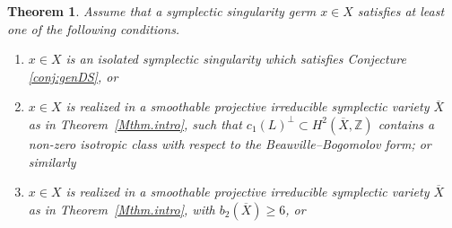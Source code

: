\documentclass[12pt,a4paper]{amsart}
\newtheorem{Thm}{Theorem}[section]
\theoremstyle{remark}
\theoremstyle{definition}
\begin{document}
\begin{Thm}\label{r1prop}
Assume that a symplectic singularity germ 
$x\in X$ satisfies at least one of the following conditions. 
\begin{enumerate}
\item \label{r1prop:isolcase}
    $x\in X$ is an isolated symplectic singularity which 
satisfies Conjecture \ref{conj:genDS}, 
or 
\item \label{r1prop:withisotrop}
$x\in X$ is realized in a smoothable projective irreducible 
symplectic variety 
$\overline{X}$ as in Theorem~\ref{Mthm.intro}, such that
$c_1(L)^{\perp}\subset H^2(\overline{X},\mathbb{Z})$
contains a non-zero isotropic class with respect to the
Beauville--Bogomolov form; or similarly 

\item \label{r1prop:bigb2case}
$x\in X$ is realized in a smoothable projective irreducible 
symplectic variety 
$\overline{X}$ as in Theorem~\ref{Mthm.intro}, with 
$b_2(\overline{X})\ge 6$, or 


\end{enumerate}
\end{Thm}
\end{document}
